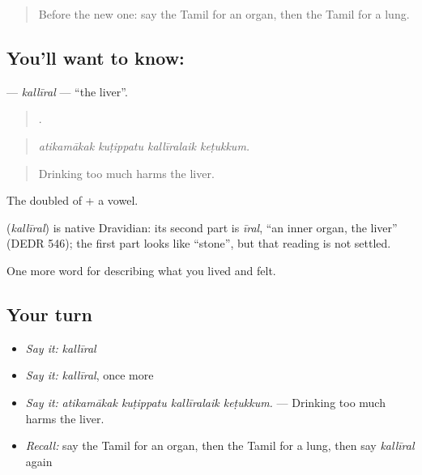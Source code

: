 \label{lesson:TA-C478-kalliral}



\begin{quote}
Before the new one: say the Tamil for an organ, then the Tamil for a lung.
\end{quote}

\subsection*{You'll want to know: }
\textbf{} — \emph{kallīral} — \textquotedblleft{}the liver\textquotedblright{}.

\begin{quote}
   .
\end{quote}

\begin{quote}
\emph{atikamākak kuṭippatu kallīralaik keṭukkum.}
\end{quote}

\begin{quote}
Drinking too much harms the liver.
\end{quote}

The doubled  of  + a vowel.

\begin{cousinweb}
\textbf{} (\emph{kallīral}) is native Dravidian: its second part is \emph{īral}, \textquotedblleft{}an inner organ, the liver\textquotedblright{} (DEDR 546); the first part looks like  \textquotedblleft{}stone\textquotedblright{}, but that reading is not settled.
\end{cousinweb}

\begin{grammarlens}[title={What you've built}]
One more word for describing what you lived and felt.
\end{grammarlens}

\subsection*{Your turn}
\begin{itemize}
\raggedright
  \item \emph{Say it:} \emph{kallīral}
  \item \emph{Say it:} \emph{kallīral}, once more
  \item \emph{Say it:} \emph{atikamākak kuṭippatu kallīralaik keṭukkum.} — Drinking too much harms the liver.
  \item \emph{Recall:} say the Tamil for an organ, then the Tamil for a lung, then say \emph{kallīral} again
\end{itemize}

